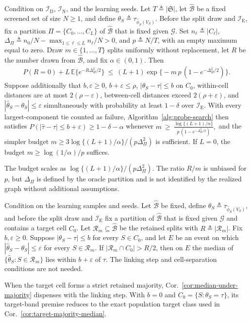 \begin{corollary}
\label{cor:budget-rule}
\normalfont

Condition on $\mathcal I_{\mathrm D}$, $\mathcal I_{\mathrm N}$, and the learning seeds. Let $T\triangleq|\mathfrak S|$, let $\widehat{\mathcal B}$ be a fixed screened set of size $N\ge1$, and define $\theta_S\triangleq\tau_{\widehat\phi_S(V_S)}$. Before the split draw and $\mathcal I_{\mathrm E}$, fix a partition $\Pi=\{C_0,\ldots,C_L\}$ of $\widehat{\mathcal B}$ that is fixed given $\mathcal G$. Set $n_\ell\triangleq|C_\ell|$, $\Delta_\Pi\triangleq n_0/N-\max_{1\le\ell\le L}n_\ell/N>0$, and $p\triangleq N/T$, with an empty maximum equal to zero. Draw $m\in\{1,\ldots,T\}$ splits uniformly without replacement, let $R$ be the number drawn from $\widehat{\mathcal B}$, and fix $\alpha\in(0,1)$. Then
\begin{align}\label{eq:sampling-failure-closed-form}
	P(R=0)+L\,\mathbb E\bigl\{e^{-R\Delta_\Pi^2/2}\bigr\}
	\ \le\
	(L+1)\exp\bigl\{-m\,p\,(1-e^{-\Delta_\Pi^2/2})\bigr\}.
\end{align}
Suppose additionally that $b,\varepsilon\ge0$, $b+\varepsilon\le\rho$, $|\theta_S-\tau|\le b$ on $C_0$, within-cell distances are at most $2(\rho-\varepsilon)$, between-cell distances exceed $2(\rho+\varepsilon)$, and $|\widehat\theta_S-\theta_S|\le\varepsilon$ simultaneously with probability at least $1-\delta$ over $\mathcal I_{\mathrm E}$. With every largest-component tie counted as failure, Algorithm~\ref{alg:probe-search} then satisfies $P(|\widehat\tau-\tau|\le b+\varepsilon)\ge1-\delta-\alpha$ whenever
\(m\ \ge\ \frac{\log\{(L+1)/\alpha\}}{p\,(1-e^{-\Delta_\Pi^2/2})},\)
and the simpler budget $m\ge3\log\{(L+1)/\alpha\}/(p\Delta_\Pi^2)$ is sufficient. If $L=0$, the budget $m\ge\log(1/\alpha)/p$ suffices.

\end{corollary}

The budget scales as $\log\{(L+1)/\alpha\}/(p\Delta_\Pi^2)$. The ratio $R/m$ is unbiased for $p$, but $\Delta_\Pi$ is defined by the oracle partition and is not identified by the realized graph without additional assumptions.

\begin{corollary}
\label{cor:median-under-majority}
\normalfont

Condition on the learning samples and seeds. Let $\widehat{\mathcal B}$ be fixed, define $\theta_S\triangleq\tau_{\widehat\phi_S(V_S)}$, and before the split draw and $\mathcal I_{\mathrm E}$ fix a partition of $\widehat{\mathcal B}$ that is fixed given $\mathcal G$ and contains a target cell $C_0$. Let $\mathcal R_m\subseteq\widehat{\mathcal B}$ be the retained splits with $R\triangleq|\mathcal R_m|$. Fix $b,\varepsilon\ge0$. Suppose $|\theta_S-\tau|\le b$ for every $S\in C_0$, and let $E$ be an event on which $|\widehat\theta_S-\theta_S|\le\varepsilon$ for every $S\in\mathcal R_m$. If $|\mathcal R_m\cap C_0|>R/2$, then on $E$ the median of $\{\widehat\theta_S:S\in\mathcal R_m\}$ lies within $b+\varepsilon$ of $\tau$. The linking step and cell-separation conditions are not needed.

\end{corollary}

When the target cell forms a strict retained majority, Cor.~\ref{cor:median-under-majority} dispenses with the linking step. With $b=0$ and $C_0=\{S:\theta_S=\tau\}$, its target-band premise reduces to the exact population target class used in Cor.~\ref{cor:target-majority-median}.
